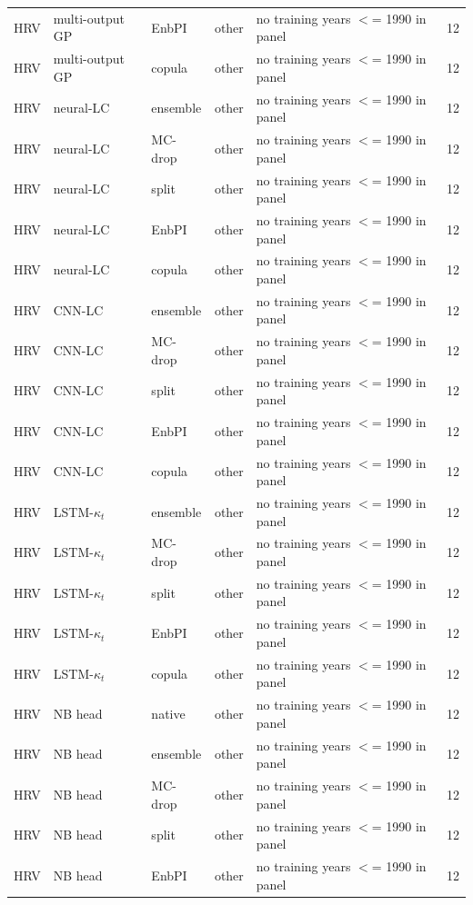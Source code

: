 {\begin{longtable}{@{}lllp{1.6cm}p{6.2cm}r@{}}
HRV & multi-output GP & EnbPI & other & no training years $<$= 1990 in panel & 12 \\
HRV & multi-output GP & copula & other & no training years $<$= 1990 in panel & 12 \\
HRV & neural-LC & ensemble & other & no training years $<$= 1990 in panel & 12 \\
HRV & neural-LC & MC-drop & other & no training years $<$= 1990 in panel & 12 \\
HRV & neural-LC & split & other & no training years $<$= 1990 in panel & 12 \\
HRV & neural-LC & EnbPI & other & no training years $<$= 1990 in panel & 12 \\
HRV & neural-LC & copula & other & no training years $<$= 1990 in panel & 12 \\
HRV & CNN-LC & ensemble & other & no training years $<$= 1990 in panel & 12 \\
HRV & CNN-LC & MC-drop & other & no training years $<$= 1990 in panel & 12 \\
HRV & CNN-LC & split & other & no training years $<$= 1990 in panel & 12 \\
HRV & CNN-LC & EnbPI & other & no training years $<$= 1990 in panel & 12 \\
HRV & CNN-LC & copula & other & no training years $<$= 1990 in panel & 12 \\
HRV & LSTM-$\kappa_t$ & ensemble & other & no training years $<$= 1990 in panel & 12 \\
HRV & LSTM-$\kappa_t$ & MC-drop & other & no training years $<$= 1990 in panel & 12 \\
HRV & LSTM-$\kappa_t$ & split & other & no training years $<$= 1990 in panel & 12 \\
HRV & LSTM-$\kappa_t$ & EnbPI & other & no training years $<$= 1990 in panel & 12 \\
HRV & LSTM-$\kappa_t$ & copula & other & no training years $<$= 1990 in panel & 12 \\
HRV & NB head & native & other & no training years $<$= 1990 in panel & 12 \\
HRV & NB head & ensemble & other & no training years $<$= 1990 in panel & 12 \\
HRV & NB head & MC-drop & other & no training years $<$= 1990 in panel & 12 \\
HRV & NB head & split & other & no training years $<$= 1990 in panel & 12 \\
HRV & NB head & EnbPI & other & no training years $<$= 1990 in panel & 12 \\

\end{longtable}}
